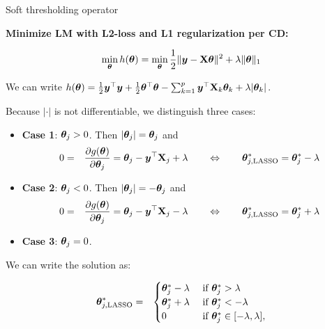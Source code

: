 \documentclass[11pt,compress,t,notes=noshow, xcolor=table]{beamer}
\begin{document}
\begin{vbframe}{Soft thresholding operator}

\textbf{Minimize LM with L2-loss and L1 regularization per CD:}

$$
    \min_{\thetab} h(\thetab) = \min_{\thetab} \frac{1}{2}\|\bm{y} - \Xmat \thetab\|^2 + \lambda \|\thetab\|_1 %
$$

We can write $h(\bm{\theta}) = \frac{1}{2}\bm{y}^\top \bm{y} + \frac{1}{2}\bm{\theta}^\top \bm{\theta}  - \sum_{k = 1}^p \bm{y}^\top \mathbf{X}_k \bm{\theta}_k + \lambda|\bm{\theta}_k|$. 

\vspace*{0.3cm}

Because $|\cdot|$ is not differentiable, we distinguish three cases: 

\begin{footnotesize}
    \begin{itemize}
        \item \textbf{Case 1}: $\bm{\theta}_j > 0$. Then $|\bm{\theta}_j| = \bm{\theta}_j$ and 
        \begin{eqnarray*}
            0 &=& \frac{\partial{g}(\bm{\theta})}{\partial \bm{\theta}_j} = \bm{\theta}_j - \bm{y}^\top \mathbf{X}_j + \lambda \qquad \Leftrightarrow \qquad \bm{\theta}^\ast_{j, \text{LASSO}} = \bm{\theta}^\ast_j - \lambda        
            \end{eqnarray*}
        \item \textbf{Case 2}: $\bm{\theta}_j < 0$. Then $|\bm{\theta}_j| = - \bm{\theta}_j$ and 
        \begin{eqnarray*}
            0 &=& \frac{\partial{g}(\bm{\theta})}{\partial \bm{\theta}_j} = \bm{\theta}_j - \bm{y}^\top \mathbf{X}_j - \lambda \qquad \Leftrightarrow \qquad \bm{\theta}^\ast_{j, \text{LASSO}} = \bm{\theta}^\ast_j + \lambda        
            \end{eqnarray*}
        \item \textbf{Case 3}: $\bm{\theta}_j = 0$. 
    \end{itemize}
\end{footnotesize}

We can write the solution as: 

\begin{eqnarray*}
    \bm{\theta}^\ast_{j, \text{LASSO}} &=& 
    \begin{cases}
        \bm{\theta}^\ast_j - \lambda & \text{ if } \bm{\theta}^\ast_j > \lambda \\
        \bm{\theta}^\ast_j + \lambda & \text{ if } \bm{\theta}^\ast_j < - \lambda \\
        0 &  \text{ if }  \bm{\theta}^\ast_j \in [- \lambda, \lambda],
    \end{cases}
\end{eqnarray*}


\end{vbframe}
\end{document}
